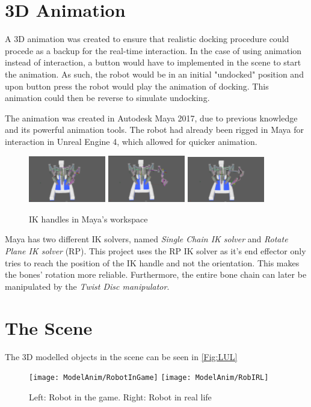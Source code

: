 \section*{3D Animation}
A 3D animation was created to ensure that realistic docking procedure could procede as a backup for the real-time interaction. In the case of using animation instead of interaction, a button would have to implemented in the scene to start the animation. As such, the robot would be in an initial "undocked" position and upon button press the robot would play the animation of docking. This animation could then be reverse to simulate undocking.

The animation was created in Autodesk Maya 2017, due to previous knowledge and its powerful animation tools. The robot had already been rigged in Maya for interaction in Unreal Engine 4, which allowed for quicker animation.

\begin{figure}[hpbt]
	\centering
	\includegraphics[width=0.3\textwidth]{ModelAnim/IK1}
	\includegraphics[width=0.3\textwidth]{ModelAnim/IK2}
	\includegraphics[width=0.3\textwidth]{ModelAnim/IK3}
	\caption{IK handles in Maya's workspace}
\end{figure}

Maya has two different IK solvers, named \textit{Single Chain IK solver} and \textit{Rotate Plane IK solver} (RP). This project uses the RP IK solver as it's end effector only tries to reach the position of the IK handle and not the orientation. This makes the bones' rotation more reliable. Furthermore, the entire bone chain can later be manipulated by the \textit{Twist Disc manipulator}.

\section*{The Scene}

The 3D modelled objects in the scene can be seen in \autoref{Fig:LUL}

\begin{figure}[hpbt]
	\centering
	\texttt{[image: ModelAnim/RobotInGame]}
	\texttt{[image: ModelAnim/RobIRL]}
	\caption{Left: Robot in the game. Right: Robot in real life}
	\label{Fig:LUL}
\end{figure}